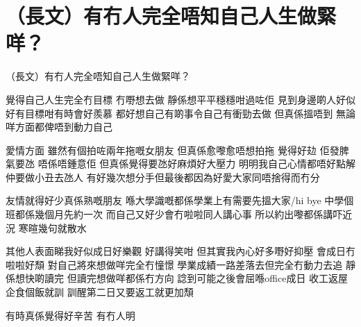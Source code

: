 \chapter{（長文）有冇人完全唔知自己人生做緊咩？}

（長文）有冇人完全唔知自己人生做緊咩？

覺得自己人生完全冇目標 冇嘢想去做 靜係想平平穩穩咁過咗佢 見到身邊啲人好似好有目標咁有時會好羨慕 都好想自己有啲事令自己有衝勁去做 但真係搵唔到 無論咩方面都俾唔到動力自己

愛情方面 雖然有個拍咗兩年拖嘅女朋友 但真係愈嚟愈唔想拍拖 覺得好攰 佢發脾氣要氹 唔係唔鍾意佢 但真係覺得要氹好麻煩好大壓力 明明我自己心情都唔好點解仲要做小丑去氹人 有好幾次想分手但最後都因為好愛大家同唔捨得而冇分

友情就得好少真係熟嘅朋友 喺大學識嘅都係學業上有需要先搵大家/hi bye  中學個班都係幾個月先約一次 而自己又好少會冇啦啦同人講心事 所以約出嚟都係講吓近況 寒暄幾句就散水

其他人表面睇我好似成日好樂觀 好講得笑咁 但其實我內心好多嘢好抑壓 會成日冇啦啦好頹 對自己將來想做咩完全冇憧憬 學業成績一路差落去但完全冇動力去追 靜係想快啲讀完 但讀完想做咩都係冇方向 諗到可能之後會屈喺office成日 收工返屋企食個飯就訓 訓醒第二日又要返工就更加頹

有時真係覺得好辛苦 有冇人明

